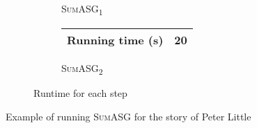 \begin{figure}[H]
\begin{subfigure}{\textwidth}
\begin{subfigure}{0.6\textwidth}
\begin{tabular}{@{}lllllll@{}}
\end{tabular}
\caption{\textsc{SumASG\textsubscript{1}}}
\end{subfigure}
\begin{subfigure}{0.4\textwidth}
\renewcommand\thesubfigure{\roman{subfigure}}
\centering
\begin{tabular}{@{}ll@{}}
\toprule
Running time (s) & 20 \\ \bottomrule
\end{tabular}
\caption{\textsc{SumASG\textsubscript{2}}}
\end{subfigure}
\setcounter{subfigure}{2}
\caption{Runtime for each step}
\end{subfigure}
\caption{Example of running \textsc{SumASG} for the story of Peter Little}
\label{fig:sumasg_example}
\end{figure}